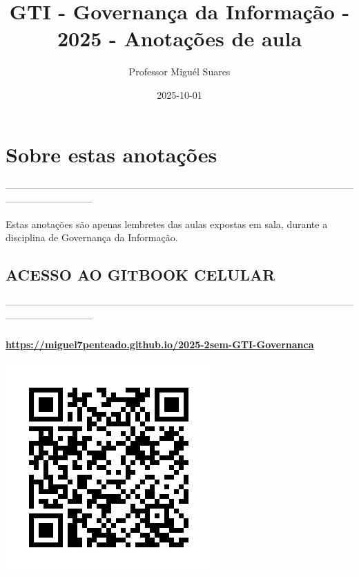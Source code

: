 \documentclass[
]{book}
\title{GTI - Governança da Informação - 2025 - Anotações de aula}
\author{Professor Miguél Suares}
\date{2025-10-01}
\begin{document}
\maketitle

{
\setcounter{tocdepth}{1}
\tableofcontents
}
\chapter*{Sobre estas anotações}\label{sobre-estas-anotauxe7uxf5es}

---------------------------------------------------------------------------------------------------------------------------------------

Estas anotações são apenas lembretes das aulas expostas em sala, durante a disciplina de Governança da Informação.

\section{ACESSO AO GITBOOK CELULAR}\label{acesso-ao-gitbook-celular}

---------------------------------------------------------------------------------------------------------------------------------------

\subsubsection{\texorpdfstring{\url{https://miguel7penteado.github.io/2025-2sem-GTI-Governanca}}{https://miguel7penteado.github.io/2025-2sem-GTI-Governanca}}\label{httpsmiguel7penteado.github.io2025-2sem-gti-governanca}

\includegraphics{images/qr-code-disciplina.jpg}
\end{document}
